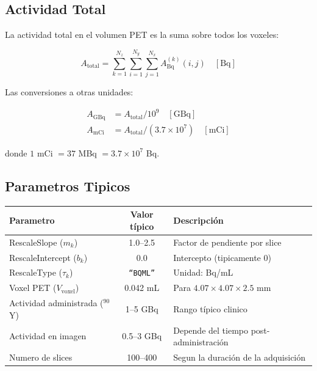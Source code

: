 \documentclass[12pt,a4paper]{article}
\begin{document}
\subsection{Actividad Total}

La actividad total en el volumen PET es la suma sobre todos los voxeles:

\begin{equation}\label{eq:act_total}
    A_{\text{total}} = \sum_{k=1}^{N_z} \sum_{i=1}^{N_y} \sum_{j=1}^{N_x}
    A_{\text{Bq}}^{(k)}(i,j) \quad [\text{Bq}]
\end{equation}

Las conversiones a otras unidades:

\begin{align}
    A_{\text{GBq}} &= A_{\text{total}} / 10^9 \quad [\text{GBq}] \\
    A_{\text{mCi}} &= A_{\text{total}} / (3.7 \times 10^7) \quad [\text{mCi}]
\end{align}

donde $1$ mCi $= 37$ MBq $= 3.7 \times 10^7$ Bq.

\subsection{Parametros Tipicos}

\begin{table}[H]
\centering
\begin{tabular}{l c l}
\toprule
\textbf{Parametro} & \textbf{Valor típico} & \textbf{Descripción} \\
\midrule
RescaleSlope ($m_k$) & 1.0--2.5 & Factor de pendiente por slice \\
RescaleIntercept ($b_k$) & 0.0 & Intercepto (tipicamente 0) \\
RescaleType ($\tau_k$) & \texttt{``BQML''} & Unidad: Bq/mL \\
Voxel PET ($V_{\text{voxel}}$) & 0.042 mL & Para $4.07 \times 4.07 \times 2.5$ mm \\
Actividad administrada ($^{90}$Y) & 1--5 GBq & Rango típico clinico \\
Actividad en imagen & 0.5--3 GBq & Depende del tiempo post-administración \\
Numero de slices & 100--400 & Segun la duración de la adquisición \\
\bottomrule
\end{tabular}
\end{table}
\end{document}
